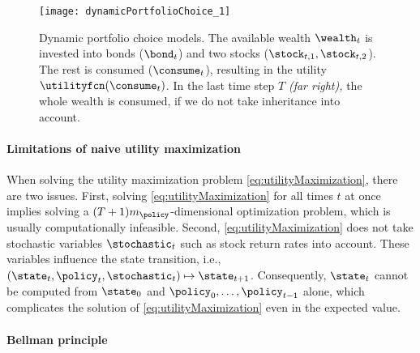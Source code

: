 \begin{SCfigure}
  \texttt{[image: dynamicPortfolioChoice\_1]}%
  \caption[Dynamic portfolio choice models]{%
    Dynamic portfolio choice models.
    The available wealth $\wealth_t$ is invested
    into bonds ($\bond_t$) and two stocks ($\stock_{t,1}, \stock_{t,2}$).
    The rest is consumed ($\consume_t$), resulting in the utility
    $\utilityfcn(\consume_t)$.
    In the last time step $T$ \emph{(far right),}
    the whole wealth is consumed, if we do not take inheritance
    into account.%
  }%
  \label{fig:dynamicPortfolioChoice}%
\end{SCfigure}

\paragraph{Limitations of naive utility maximization}

When solving the utility maximization problem \eqref{eq:utilityMaximization},
there are two issues.
First, solving \eqref{eq:utilityMaximization} for all times $t$ at once
implies solving a $(T+1) m_{\policy}$-dimensional optimization problem,
which is usually computationally infeasible.
Second, \eqref{eq:utilityMaximization} does not take stochastic variables
$\stochastic_t$ such as stock return rates into account.
These variables influence the state transition, i.e.,
$(\state_t, \policy_t, \stochastic_t) \mapsto \state_{t+1}$.
Consequently, $\state_t$ cannot be computed from $\state_0$ and
$\policy_0, \dotsc, \policy_{t-1}$ alone,
which complicates the solution of \eqref{eq:utilityMaximization}
even in the expected value.

\paragraph{Bellman principle}

